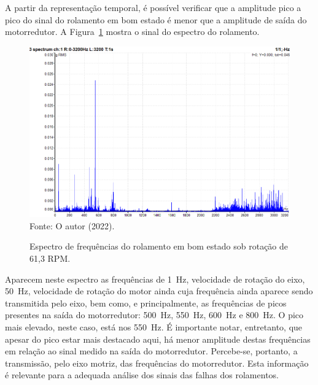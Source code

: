 \documentclass[
	12pt,				
	oneside,			
	a4paper,			
	english,			
	brazil,			
	]{abntex2ppgsi}
\begin{document}
A partir da representação temporal, é possível verificar que a amplitude pico a pico do sinal do rolamento em bom estado é menor que a amplitude de saída do motorredutor. A Figura~\ref{ROLAMENTO_BOM_ESTADO_ESPECTRO} mostra o sinal do espectro do rolamento. 

\begin{figure}[H]
\centering
\caption {Espectro de frequências do rolamento em bom estado sob rotação de 61,3 RPM.}
\includegraphics[width=\textwidth,keepaspectratio]{ROLAMENTO_BOM_ESTADO_ESPECTRO} \\
Fonte: O autor (2022).
\label{ROLAMENTO_BOM_ESTADO_ESPECTRO}
\end{figure}

Aparecem neste espectro as frequências de \SI{1}{\hertz}, velocidade de rotação do eixo, \SI{50}{\hertz}, velocidade de rotação do motor ainda cuja frequência ainda aparece sendo transmitida pelo eixo, bem como, e principalmente, as frequências de picos presentes na saída do motorredutor:  \SI{500}{\hertz}, \SI{550}{\hertz}, \SI{600}{\hertz} e \SI{800}{\hertz}. O pico mais elevado, neste caso, está nos \SI{550}{\hertz}. É importante notar, entretanto, que apesar do pico estar mais destacado aqui, há menor amplitude destas frequências em relação ao sinal medido na saída do motorredutor. Percebe-se, portanto, a transmissão, pelo eixo motriz, das frequências do motorredutor. Esta informação é relevante para a adequada análise dos sinais das falhas dos rolamentos.

\subsection{}
\end{document}
